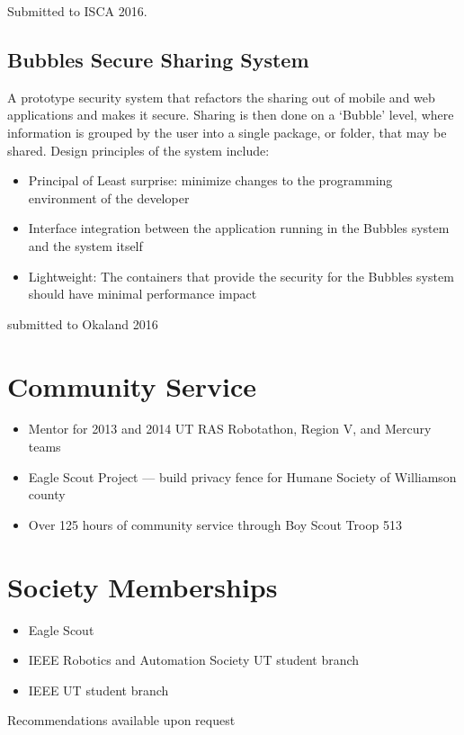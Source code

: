\documentclass[letterpaper,12pt]{resume}
\begin{document}
Submitted to ISCA 2016.

\subsection{Bubbles Secure Sharing System}
\noindent
A prototype security system that refactors the sharing out of mobile and web 
applications and makes it secure.
Sharing is then done on a `Bubble' level, where information is grouped by the
user into a single package, or folder,  that may be shared.
Design principles of the system include:
\begin{itemize}
  \item
    Principal of Least surprise: minimize changes to the programming environment of the developer
  \item
    Interface integration between the application running in the Bubbles system and the system itself
  \item
    Lightweight: The containers that provide the security for the Bubbles system
    should have minimal performance impact
\end{itemize}
submitted to Okaland 2016

\section{Community Service}
\begin{itemize}
  \item
    Mentor for 2013 and 2014 UT RAS Robotathon, Region V, and Mercury teams
  \item
    Eagle Scout Project --- build privacy fence for Humane Society of Williamson county
  \item
    Over 125 hours of community service through Boy Scout Troop 513
\end{itemize}

\section{Society Memberships}
\begin{itemize}
  \item
    Eagle Scout
  \item
    IEEE Robotics and Automation Society UT student branch
  \item
    IEEE UT student branch
\end{itemize}



\par
\begin{center}
  Recommendations available upon request
\end{center}
\end{document}
